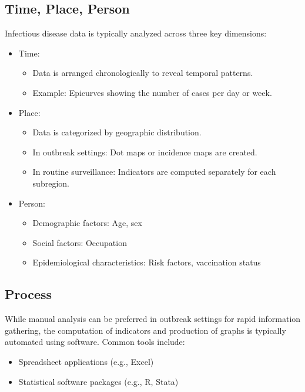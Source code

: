 \documentclass[
  letterpaper,
  DIV=11,
  numbers=noendperiod]{scrreprt}
\providecommand{\tightlist}{%
  \setlength{\itemsep}{0pt}\setlength{\parskip}{0pt}}\usepackage{longtable,booktabs,array}
\begin{document}
\subsection{Time, Place, Person}\label{time-place-person}

Infectious disease data is typically analyzed across three key
dimensions:

\begin{itemize}
\tightlist
\item
  Time:

  \begin{itemize}
  \tightlist
  \item
    Data is arranged chronologically to reveal temporal patterns.
  \item
    Example: Epicurves showing the number of cases per day or week.
  \end{itemize}
\item
  Place:

  \begin{itemize}
  \tightlist
  \item
    Data is categorized by geographic distribution.
  \item
    In outbreak settings: Dot maps or incidence maps are created.
  \item
    In routine surveillance: Indicators are computed separately for each
    subregion.
  \end{itemize}
\item
  Person:

  \begin{itemize}
  \tightlist
  \item
    Demographic factors: Age, sex
  \item
    Social factors: Occupation
  \item
    Epidemiological characteristics: Risk factors, vaccination status
  \end{itemize}
\end{itemize}

\subsection{Process}\label{process}

While manual analysis can be preferred in outbreak settings for rapid
information gathering, the computation of indicators and production of
graphs is typically automated using software. Common tools include:

\begin{itemize}
\tightlist
\item
  Spreadsheet applications (e.g., Excel)
\item
  Statistical software packages (e.g., R, Stata)
\end{itemize}
\end{document}
